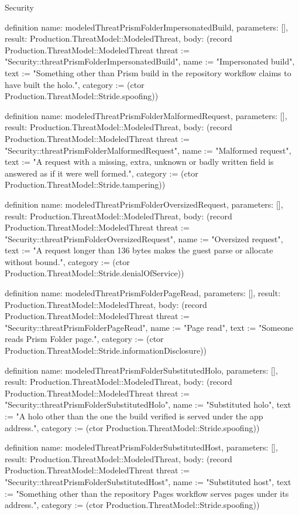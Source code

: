 \begin{lexlean}{Security}
\begin{semanticmodule}
definition{
  name: modeledThreatPrismFolderImpersonatedBuild,
  parameters: [],
  result: Production.ThreatModel::ModeledThreat,
  body: (record Production.ThreatModel::ModeledThreat {threat := "Security::threatPrismFolderImpersonatedBuild", name := "Impersonated build", text := "Something other than Prism build in the repository workflow claims to have built the holo.", category := (ctor Production.ThreatModel::Stride.spoofing)})
}

definition{
  name: modeledThreatPrismFolderMalformedRequest,
  parameters: [],
  result: Production.ThreatModel::ModeledThreat,
  body: (record Production.ThreatModel::ModeledThreat {threat := "Security::threatPrismFolderMalformedRequest", name := "Malformed request", text := "A request with a missing, extra, unknown or badly written field is answered as if it were well formed.", category := (ctor Production.ThreatModel::Stride.tampering)})
}

definition{
  name: modeledThreatPrismFolderOversizedRequest,
  parameters: [],
  result: Production.ThreatModel::ModeledThreat,
  body: (record Production.ThreatModel::ModeledThreat {threat := "Security::threatPrismFolderOversizedRequest", name := "Oversized request", text := "A request longer than 136 bytes makes the guest parse or allocate without bound.", category := (ctor Production.ThreatModel::Stride.denialOfService)})
}

definition{
  name: modeledThreatPrismFolderPageRead,
  parameters: [],
  result: Production.ThreatModel::ModeledThreat,
  body: (record Production.ThreatModel::ModeledThreat {threat := "Security::threatPrismFolderPageRead", name := "Page read", text := "Someone reads Prism Folder page.", category := (ctor Production.ThreatModel::Stride.informationDisclosure)})
}

definition{
  name: modeledThreatPrismFolderSubstitutedHolo,
  parameters: [],
  result: Production.ThreatModel::ModeledThreat,
  body: (record Production.ThreatModel::ModeledThreat {threat := "Security::threatPrismFolderSubstitutedHolo", name := "Substituted holo", text := "A holo other than the one the build verified is served under the app address.", category := (ctor Production.ThreatModel::Stride.spoofing)})
}

definition{
  name: modeledThreatPrismFolderSubstitutedHost,
  parameters: [],
  result: Production.ThreatModel::ModeledThreat,
  body: (record Production.ThreatModel::ModeledThreat {threat := "Security::threatPrismFolderSubstitutedHost", name := "Substituted host", text := "Something other than the repository Pages workflow serves pages under its address.", category := (ctor Production.ThreatModel::Stride.spoofing)})
}


\end{semanticmodule}
\end{lexlean}
